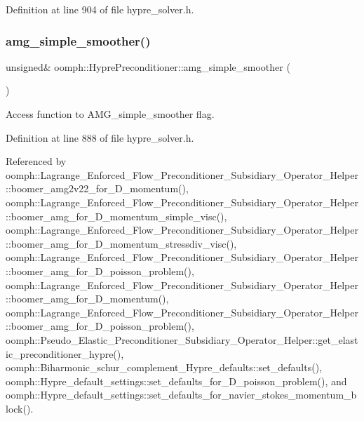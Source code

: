 Definition at line 904 of file hypre\+\_\+solver.\+h.

\mbox{\label{classoomph_1_1HyprePreconditioner_a0abc961b0dfacd9b6bf7e1da428ab484}} 
\subsubsection{\texorpdfstring{amg\+\_\+simple\+\_\+smoother()}{amg\_simple\_smoother()}}
{\footnotesize\ttfamily unsigned\& oomph\+::\+Hypre\+Preconditioner\+::amg\+\_\+simple\+\_\+smoother (\begin{DoxyParamCaption}{ }\end{DoxyParamCaption})\hspace{0.3cm}{\ttfamily [inline]}}



Access function to A\+M\+G\+\_\+simple\+\_\+smoother flag. 



Definition at line 888 of file hypre\+\_\+solver.\+h.



Referenced by oomph\+::\+Lagrange\+\_\+\+Enforced\+\_\+\+Flow\+\_\+\+Preconditioner\+\_\+\+Subsidiary\+\_\+\+Operator\+\_\+\+Helper\+::boomer\+\_\+amg2v22\+\_\+for\+\_\+D\+\_\+momentum(), oomph\+::\+Lagrange\+\_\+\+Enforced\+\_\+\+Flow\+\_\+\+Preconditioner\+\_\+\+Subsidiary\+\_\+\+Operator\+\_\+\+Helper\+::boomer\+\_\+amg\+\_\+for\+\_\+D\+\_\+momentum\+\_\+simple\+\_\+visc(), oomph\+::\+Lagrange\+\_\+\+Enforced\+\_\+\+Flow\+\_\+\+Preconditioner\+\_\+\+Subsidiary\+\_\+\+Operator\+\_\+\+Helper\+::boomer\+\_\+amg\+\_\+for\+\_\+D\+\_\+momentum\+\_\+stressdiv\+\_\+visc(), oomph\+::\+Lagrange\+\_\+\+Enforced\+\_\+\+Flow\+\_\+\+Preconditioner\+\_\+\+Subsidiary\+\_\+\+Operator\+\_\+\+Helper\+::boomer\+\_\+amg\+\_\+for\+\_\+D\+\_\+poisson\+\_\+problem(), oomph\+::\+Lagrange\+\_\+\+Enforced\+\_\+\+Flow\+\_\+\+Preconditioner\+\_\+\+Subsidiary\+\_\+\+Operator\+\_\+\+Helper\+::boomer\+\_\+amg\+\_\+for\+\_\+D\+\_\+momentum(), oomph\+::\+Lagrange\+\_\+\+Enforced\+\_\+\+Flow\+\_\+\+Preconditioner\+\_\+\+Subsidiary\+\_\+\+Operator\+\_\+\+Helper\+::boomer\+\_\+amg\+\_\+for\+\_\+D\+\_\+poisson\+\_\+problem(), oomph\+::\+Pseudo\+\_\+\+Elastic\+\_\+\+Preconditioner\+\_\+\+Subsidiary\+\_\+\+Operator\+\_\+\+Helper\+::get\+\_\+elastic\+\_\+preconditioner\+\_\+hypre(), oomph\+::\+Biharmonic\+\_\+schur\+\_\+complement\+\_\+\+Hypre\+\_\+defaults\+::set\+\_\+defaults(), oomph\+::\+Hypre\+\_\+default\+\_\+settings\+::set\+\_\+defaults\+\_\+for\+\_\+D\+\_\+poisson\+\_\+problem(), and oomph\+::\+Hypre\+\_\+default\+\_\+settings\+::set\+\_\+defaults\+\_\+for\+\_\+navier\+\_\+stokes\+\_\+momentum\+\_\+block().

